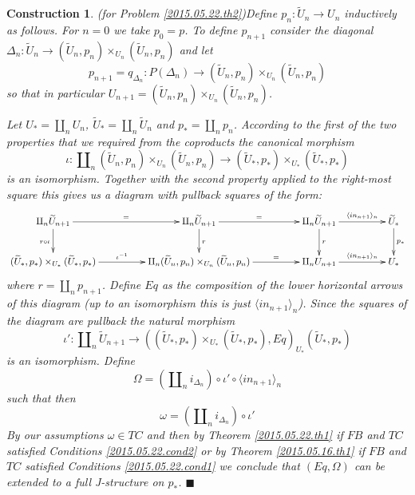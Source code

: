 \documentclass[12pt]{article}
\numberwithin{equation}{section}
\newtheorem{construction0}[proposition]{Construction}
\newenvironment{construction}[1]{\begin{construction0}(for Problem \ref{#1})}{$\blacksquare$ \end{construction0}}
\newcommand{\llabel}[1]{\label{#1}}
\newcommand{\sr}{\rightarrow}
\newcommand{\wt}{\widetilde}
\begin{document}
%
\begin{construction}{2015.05.22.th2}\rm\llabel{2015.05.23.constr1}
Define $p_n:\wt{U}_n\sr U_n$ inductively as follows. For $n=0$ we take
$p_0=p$. To define $p_{n+1}$ consider the diagonal $\Delta_n:\wt{U}_n\sr
(\wt{U}_n,p_n)\times_{U_n}(\wt{U}_n,p_n)$ and let
%
$$p_{n+1}=q_{\Delta_n}:P(\Delta_n)\sr
(\wt{U}_n,p_n)\times_{U_n}(\wt{U}_n,p_n)$$
%
so that in particular $U_{n+1}=(\wt{U}_n,p_n)\times_{U_n}(\wt{U}_n,p_n)$.

Let $U_*=\amalg_n U_n$, $\wt{U}_*=\amalg_n\wt{U}_n$ and $p_*=\amalg_n
p_n$. According to the first of the two properties that we required from the
coproducts the canonical morphism
%
$$\iota:\amalg_n (\wt{U}_n,p_n)\times_{U_n}(\wt{U}_n,p_n)\sr
(\wt{U}_*,p_*)\times_{U_*}(\wt{U}_*,p_*)$$
%
is an isomorphism. Together with the second property applied to the right-most
square this gives us a diagram with pullback squares of the form:
%
$$
\begin{xy}
          \xymatrix@C=4pc{
                 \amalg_n\wt{U}_{n+1}  \ar[r]^-{=} \ar[d]_{r\circ \iota} & 
                 \amalg_n\wt{U}_{n+1} \ar[r]^-{=} \ar[d]^{r} &
		 \amalg_n\wt{U}_{n+1} \ar[r]^-{\langle in_{n+1} \rangle_{n}} \ar[d]^{r} &
		\wt{U}_* \ar[d]^{p_*} \\
		(\wt{U}_*,p_*)\times_{U_*}(\wt{U}_*,p_*) \ar[r]^-{\iota^{-1}} &
		\amalg_n (\wt{U}_n,p_n)\times_{U_n}(\wt{U}_n,p_n) \ar[r]^-{=} &
		\amalg_n U_{n+1} \ar[r]^-{\langle in_{n+1} \rangle_{n}} &
		U_*
                }
\end{xy}
$$
%
where  $r=\amalg_n  p_{n+1}$. Define  $Eq$  as  the  composition of  the  lower
horizontal arrows of  this diagram (up to an isomorphism  this is just $\langle
in_{n+1}\rangle_{n}$).  Since  the squares  of  the  diagram are  pullback  the
natural morphism
%
$$\iota':\amalg_n\wt{U}_{n+1}\sr
((\wt{U}_*,p_*)\times_{U_*}(\wt{U}_*,p_*),Eq)_{U_*} (\wt{U}_*,p_*)$$
%
is an isomorphism. Define
%
$$\Omega=(\amalg_n    i_{\Delta_n})\circ     \iota'\circ    \langle    in_{n+1}
\rangle_{n}$$
%
such that then
%
$$\omega=(\amalg_n i_{\Delta_n})\circ \iota'$$
%
By our assumptions  $\omega\in TC$ and then by  Theorem \ref{2015.05.22.th1} if
$FB$  and  $TC$  satisfied  Conditions  \ref{2015.05.22.cond2}  or  by  Theorem
\ref{2015.05.16.th1}     if    $FB$     and    $TC$     satisfied    Conditions
\ref{2015.05.22.cond1} we conclude that $(Eq,\Omega)$ can be extended to a full
J-structure on $p_*$.
\end{construction}
%
\end{document}
